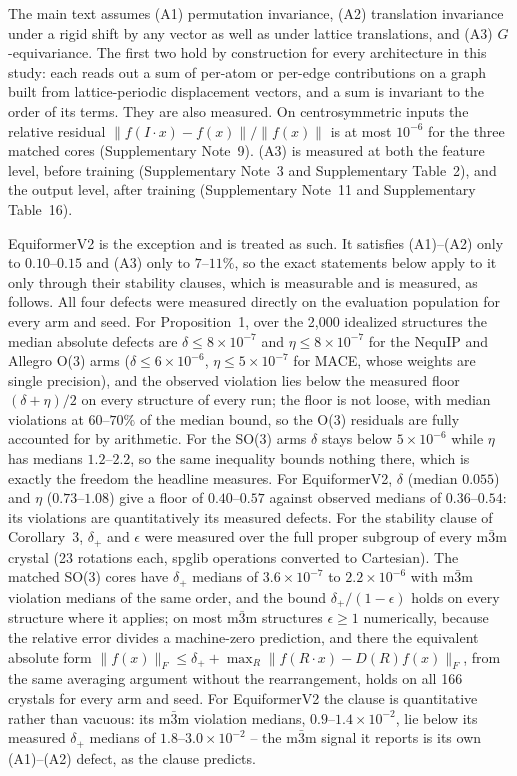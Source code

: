 The main text assumes (A1) permutation invariance, (A2) translation invariance under a rigid shift by any vector as well as under lattice translations, and (A3) $G$-equivariance. The first two hold by construction for every architecture in this study: each reads out a sum of per-atom or per-edge contributions on a graph built from lattice-periodic displacement vectors, and a sum is invariant to the order of its terms. They are also measured. On centrosymmetric inputs the relative residual $\lVert f(I\!\cdot\!x)-f(x)\rVert/\lVert f(x)\rVert$ is at most $10^{-6}$ for the three matched cores (Supplementary Note~9). (A3) is measured at both the feature level, before training (Supplementary Note~3 and Supplementary Table~2), and the output level, after training (Supplementary Note~11 and Supplementary Table~16).

EquiformerV2 is the exception and is treated as such. It satisfies (A1)--(A2) only to $0.10$--$0.15$ and (A3) only to $7$--$11\%$, so the exact statements below apply to it only through their stability clauses, which is measurable and is measured, as follows. All four defects were measured directly on the evaluation population for every arm and seed. For Proposition~1, over the 2,000 idealized structures the median absolute defects are $\delta \le 8\times10^{-7}$ and $\eta \le 8\times10^{-7}$ for the NequIP and Allegro O(3) arms ($\delta \le 6\times10^{-6}$, $\eta \le 5\times10^{-7}$ for MACE, whose weights are single precision), and the observed violation lies below the measured floor $(\delta+\eta)/2$ on every structure of every run; the floor is not loose, with median violations at $60$--$70\%$ of the median bound, so the O(3) residuals are fully accounted for by arithmetic. For the SO(3) arms $\delta$ stays below $5\times10^{-6}$ while $\eta$ has medians $1.2$--$2.2$, so the same inequality bounds nothing there, which is exactly the freedom the headline measures. For EquiformerV2, $\delta$ (median $0.055$) and $\eta$ ($0.73$--$1.08$) give a floor of $0.40$--$0.57$ against observed medians of $0.36$--$0.54$: its violations are quantitatively its measured defects. For the stability clause of Corollary~3, $\delta_{+}$ and $\epsilon$ were measured over the full proper subgroup of every m$\bar 3$m crystal (23 rotations each, spglib operations converted to Cartesian). The matched SO(3) cores have $\delta_{+}$ medians of $3.6\times10^{-7}$ to $2.2\times10^{-6}$ with m$\bar 3$m violation medians of the same order, and the bound $\delta_{+}/(1-\epsilon)$ holds on every structure where it applies; on most m$\bar 3$m structures $\epsilon \ge 1$ numerically, because the relative error divides a machine-zero prediction, and there the equivalent absolute form $\lVert f(x)\rVert_F \le \delta_{+} + \max_{R}\lVert f(R\!\cdot\!x) - D(R)f(x)\rVert_F$, from the same averaging argument without the rearrangement, holds on all 166 crystals for every arm and seed. For EquiformerV2 the clause is quantitative rather than vacuous: its m$\bar 3$m violation medians, $0.9$--$1.4\times10^{-2}$, lie below its measured $\delta_{+}$ medians of $1.8$--$3.0\times10^{-2}$ -- the m$\bar 3$m signal it reports is its own (A1)--(A2) defect, as the clause predicts.

